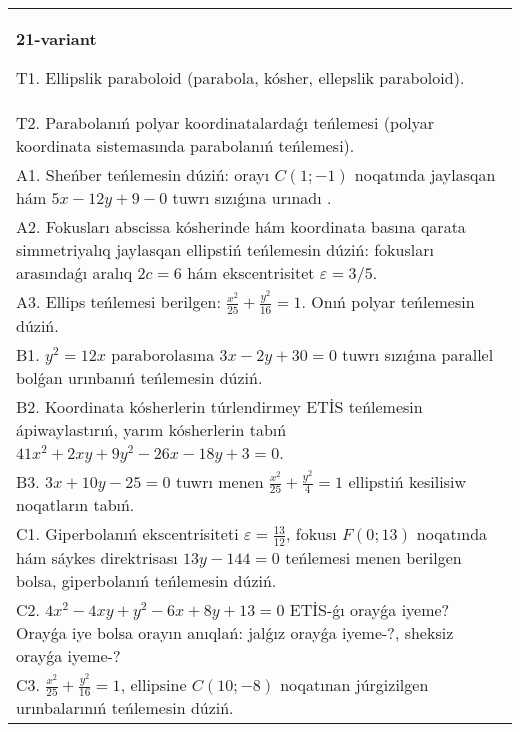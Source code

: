 \documentclass{article}
\begin{document}
\begin{tabular}{m{17cm}}
\textbf{21-variant}
\newline

T1. Ellipslik paraboloid (parabola, kósher, ellepslik paraboloid).\\

T2. Parabolanıń polyar koordinatalardaǵı teńlemesi (polyar koordinata sistemasında parabolanıń teńlemesi).\\

A1. Sheńber teńlemesin dúziń: orayı $C (1;-1) $ noqatında jaylasqan hám $5 x-12 y+9 -0$ tuwrı sızıǵına urınadı .\\

A2. Fokusları abscissa kósherinde hám koordinata basına qarata simmetriyalıq jaylasqan ellipstiń teńlemesin dúziń: fokusları arasındaǵı aralıq $2 c=6$ hám ekscentrisitet $\varepsilon=3/5$.\\

A3. Ellips teńlemesi berilgen: $\frac{x^2}{25}+\frac{y^2}{16}=1$. Onıń polyar teńlemesin dúziń.\\

B1. $y^{2} = 12x$ paraborolasına $3x - 2y + 30 = 0$ tuwrı sızıǵına parallel bolǵan urınbanıń teńlemesin dúziń.  \\

B2. Koordinata kósherlerin túrlendirmey ETİS teńlemesin ápiwaylastırıń, yarım kósherlerin tabıń $41x^{2} + 2xy + 9y^{2} - 26x - 18y + 3 = 0$.  \\

B3. $3x + 10y - 25 = 0$ tuwrı menen $\frac{x^{2}}{25} + \frac{y^{2}}{4} = 1$ ellipstiń kesilisiw noqatların tabıń.\\

C1. Giperbolanıń ekscentrisiteti $\varepsilon = \frac{13}{12}$, fokusı $F(0;13)$ noqatında hám sáykes direktrisası $13y - 144 = 0$ teńlemesi menen berilgen bolsa, giperbolanıń teńlemesin dúziń.  \\

C2. $4x^{2} - 4xy + y^{2} - 6x + 8y + 13 = 0$ ETİS-ǵı orayǵa iyeme? Orayǵa iye bolsa orayın anıqlań: jalǵız orayǵa iyeme-?, sheksiz orayǵa iyeme-?  \\

C3. $\frac{x^{2}}{25} + \frac{y^{2}}{16} = 1$, ellipsine $C(10; - 8)$ noqatınan júrgizilgen urınbalarınıń teńlemesin dúziń.  \\

\end{tabular}
\vspace{1cm}
\end{document}

